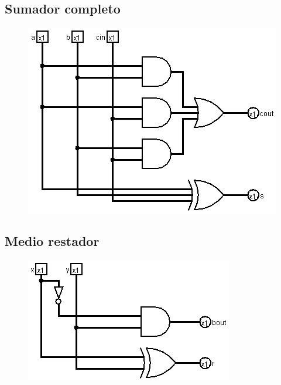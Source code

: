 \documentclass[11pt]{article}
\begin{document}
	\subsection{Sumador completo}
	\begin{figure}[H]
		\centering
		\includegraphics[scale=0.7]{fullAdder.png}
	\end{figure}
	
	\subsection{Medio restador}
	\begin{figure}[H]
		\centering
		\includegraphics[scale=0.7]{halfSubtracter.png}
	\end{figure}
	
\end{document}
